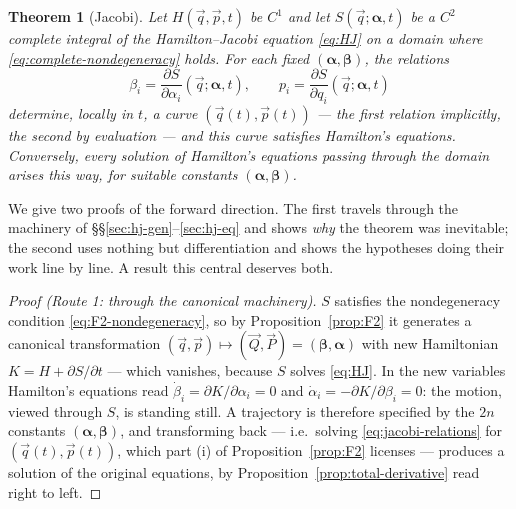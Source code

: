 \documentclass[11pt]{article}
\theoremstyle{plain}
\newtheorem{theorem}{Theorem}[section]
\theoremstyle{definition}
\theoremstyle{remark}
\newcommand{\pd}[2]{\frac{\partial #1}{\partial #2}}
\newcommand{\vq}{\vec{q}}
\newcommand{\vp}{\vec{p}}
\newcommand{\vQ}{\vec{Q}}
\newcommand{\vP}{\vec{P}}
\begin{document}
\begin{theorem}[Jacobi]
\label{thm:jacobi}
Let $H(\vq, \vp, t)$ be $C^1$ and let $S(\vq; \boldsymbol{\alpha}, t)$
be a $C^2$ complete integral of the Hamilton--Jacobi equation
\eqref{eq:HJ} on a domain where
\eqref{eq:complete-nondegeneracy} holds. For each fixed
$(\boldsymbol{\alpha}, \boldsymbol{\beta})$, the relations
\begin{equation}
  \beta_i = \pd{S}{\alpha_i}(\vq; \boldsymbol{\alpha}, t),
  \qquad
  p_i = \pd{S}{q_i}(\vq; \boldsymbol{\alpha}, t)
  \label{eq:jacobi-relations}
\end{equation}
determine, locally in $t$, a curve $(\vq(t), \vp(t))$ --- the first
relation implicitly, the second by evaluation --- and this curve
satisfies Hamilton's equations. Conversely, every solution of
Hamilton's equations passing through the domain arises this way, for
suitable constants $(\boldsymbol{\alpha}, \boldsymbol{\beta})$.
\end{theorem}

We give two proofs of the forward direction. The first travels through
the machinery of \S\S\ref{sec:hj-gen}--\ref{sec:hj-eq} and shows
\emph{why} the theorem was inevitable; the second uses nothing but
differentiation and shows the hypotheses doing their work line by
line. A result this central deserves both.

\begin{proof}[Proof (Route 1: through the canonical machinery)]
$S$ satisfies the nondegeneracy condition
\eqref{eq:F2-nondegeneracy}, so by Proposition~\ref{prop:F2} it
generates a canonical transformation $(\vq, \vp) \mapsto
(\vQ, \vP) = (\boldsymbol{\beta}, \boldsymbol{\alpha})$ with new
Hamiltonian $K = H + \partial S/\partial t$ --- which vanishes,
because $S$ solves \eqref{eq:HJ}. In the new variables Hamilton's
equations read $\dot\beta_i = \partial K/\partial\alpha_i = 0$ and
$\dot\alpha_i = -\partial K/\partial\beta_i = 0$: the motion, viewed
through $S$, is standing still. A trajectory is therefore specified by
the $2n$ constants $(\boldsymbol{\alpha}, \boldsymbol{\beta})$, and
transforming back --- i.e.\ solving \eqref{eq:jacobi-relations} for
$(\vq(t), \vp(t))$, which part (i) of Proposition~\ref{prop:F2}
licenses --- produces a solution of the original equations, by
Proposition~\ref{prop:total-derivative} read right to left.
\end{proof}
\end{document}
